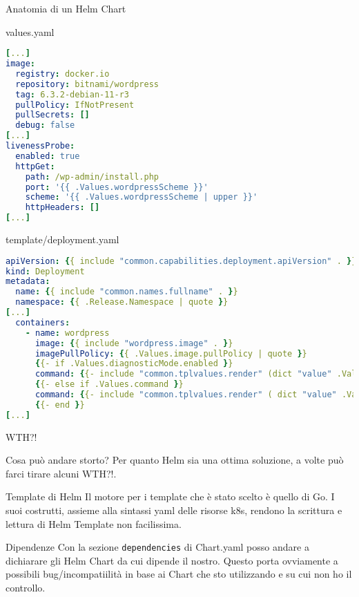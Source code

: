 \documentclass{beamer}
\begin{document}
\begin{frame}{Anatomia di un Helm Chart}
\begin{block}{values.yaml}
\begin{lstlisting}[backgroundcolor=\color{white},language=yaml,basicstyle=\tiny]
[...]
image:
  registry: docker.io
  repository: bitnami/wordpress
  tag: 6.3.2-debian-11-r3
  pullPolicy: IfNotPresent
  pullSecrets: []
  debug: false
[...]
livenessProbe:
  enabled: true
  httpGet:
    path: /wp-admin/install.php
    port: '{{ .Values.wordpressScheme }}'
    scheme: '{{ .Values.wordpressScheme | upper }}'
    httpHeaders: []
[...]
  \end{lstlisting}
  \end{block}
 \framebreak
 \begin{block}{template/deployment.yaml}
 \begin{lstlisting}[backgroundcolor=\color{white},language=yaml,basicstyle=\tiny]
apiVersion: {{ include "common.capabilities.deployment.apiVersion" . }}
kind: Deployment
metadata:
  name: {{ include "common.names.fullname" . }}
  namespace: {{ .Release.Namespace | quote }}
[...]
  containers:
    - name: wordpress
      image: {{ include "wordpress.image" . }}
      imagePullPolicy: {{ .Values.image.pullPolicy | quote }}
      {{- if .Values.diagnosticMode.enabled }}
      command: {{- include "common.tplvalues.render" (dict "value" .Values.diagnosticMode.command "context" $) | nindent 12 }}
      {{- else if .Values.command }}
      command: {{- include "common.tplvalues.render" ( dict "value" .Values.command "context" $) | nindent 12 }}
      {{- end }}
[...]
\end{lstlisting}
\end{block}
\end{frame} 
\begin{frame}{WTH?!}
\begin{block}{Cosa può andare storto?}
Per quanto Helm sia una ottima soluzione, a volte può farci tirare alcuni  WTH?!.
\end{block}
\framebreak
\begin{block}{Template di Helm}
 Il motore per i template che è stato scelto è quello di Go.
 I suoi costrutti, assieme alla sintassi yaml delle risorse k8s, rendono la scrittura e lettura di Helm Template non facilissima.  
\end{block}
\framebreak
\begin{block}{Dipendenze}
Con la sezione \lstinline{dependencies} di Chart.yaml posso andare a dichiarare gli Helm Chart da cui dipende il nostro.
Questo porta ovviamente a possibili bug/incompatiilità in base ai Chart che sto utilizzando e su cui non ho il controllo.
\end{block}
\framebreak
\begin{block}{}
\end{block}
\end{frame}
\end{document}

